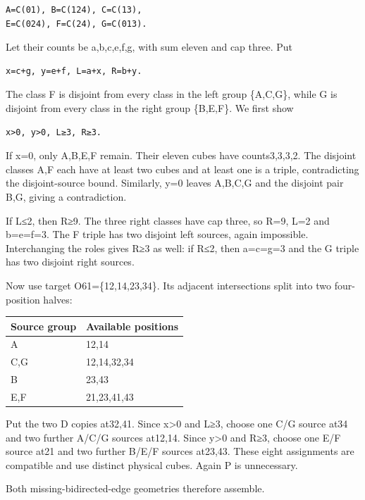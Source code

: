 \documentclass[
  10pt,
]{article}
\begin{document}
\begin{verbatim}
A=C(01), B=C(124), C=C(13),
E=C(024), F=C(24), G=C(013).
\end{verbatim}

Let their counts be a,b,c,e,f,g, with sum eleven and cap three. Put

\begin{verbatim}
x=c+g, y=e+f, L=a+x, R=b+y.
\end{verbatim}

The class F is disjoint from every class in the left group \{A,C,G\},
while G is disjoint from every class in the right group \{B,E,F\}. We
first show

\begin{verbatim}
x>0, y>0, L≥3, R≥3.
\end{verbatim}

If x=0, only A,B,E,F remain. Their eleven cubes have counts3,3,3,2. The
disjoint classes A,F each have at least two cubes and at least one is a
triple, contradicting the disjoint-source bound. Similarly, y=0 leaves
A,B,C,G and the disjoint pair B,G, giving a contradiction.

If L≤2, then R≥9. The three right classes have cap three, so R=9, L=2
and b=e=f=3. The F triple has two disjoint left sources, again
impossible. Interchanging the roles gives R≥3 as well: if R≤2, then
a=c=g=3 and the G triple has two disjoint right sources.

Now use target O61=\{12,14,23,34\}. Its adjacent intersections split
into two four-position halves:

\begin{longtable}[]{@{}ll@{}}
\toprule\noalign{}
Source group & Available positions \\
\midrule\noalign{}
\endhead
\bottomrule\noalign{}
\endlastfoot
A & 12,14 \\
C,G & 12,14,32,34 \\
B & 23,43 \\
E,F & 21,23,41,43 \\
\end{longtable}

Put the two D copies at32,41. Since x\textgreater0 and L≥3, choose one
C/G source at34 and two further A/C/G sources at12,14. Since
y\textgreater0 and R≥3, choose one E/F source at21 and two further B/E/F
sources at23,43. These eight assignments are compatible and use distinct
physical cubes. Again P is unnecessary.

Both missing-bidirected-edge geometries therefore assemble.
\end{document}
